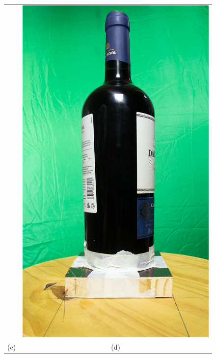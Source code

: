 \begin{figure}[ht]
\begin{minipage}{.9\textwidth}
\begin{tabular}{cc}
            &
            \includegraphics[width=.3\textwidth]{TCC/Imagens/ensaios/270.jpg} \\
            (c) & (d)
            \end{tabular}
	\end{minipage}
    \label{fig:figs_panoramica}
\end{figure}



    
